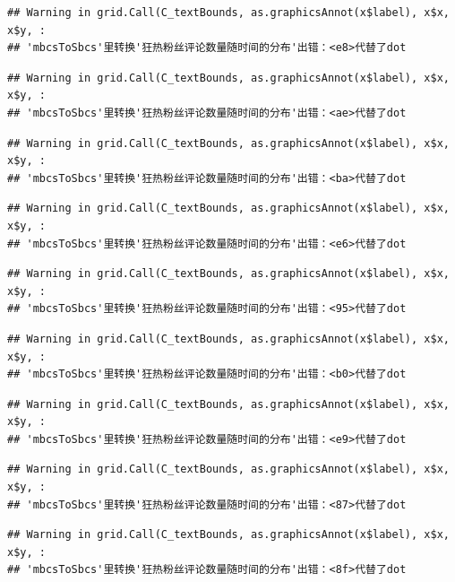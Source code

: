 \documentclass[
]{article}
\begin{document}
\begin{verbatim}
## Warning in grid.Call(C_textBounds, as.graphicsAnnot(x$label), x$x, x$y, :
## 'mbcsToSbcs'里转换'狂热粉丝评论数量随时间的分布'出错：<e8>代替了dot
\end{verbatim}

\begin{verbatim}
## Warning in grid.Call(C_textBounds, as.graphicsAnnot(x$label), x$x, x$y, :
## 'mbcsToSbcs'里转换'狂热粉丝评论数量随时间的分布'出错：<ae>代替了dot
\end{verbatim}

\begin{verbatim}
## Warning in grid.Call(C_textBounds, as.graphicsAnnot(x$label), x$x, x$y, :
## 'mbcsToSbcs'里转换'狂热粉丝评论数量随时间的分布'出错：<ba>代替了dot
\end{verbatim}

\begin{verbatim}
## Warning in grid.Call(C_textBounds, as.graphicsAnnot(x$label), x$x, x$y, :
## 'mbcsToSbcs'里转换'狂热粉丝评论数量随时间的分布'出错：<e6>代替了dot
\end{verbatim}

\begin{verbatim}
## Warning in grid.Call(C_textBounds, as.graphicsAnnot(x$label), x$x, x$y, :
## 'mbcsToSbcs'里转换'狂热粉丝评论数量随时间的分布'出错：<95>代替了dot
\end{verbatim}

\begin{verbatim}
## Warning in grid.Call(C_textBounds, as.graphicsAnnot(x$label), x$x, x$y, :
## 'mbcsToSbcs'里转换'狂热粉丝评论数量随时间的分布'出错：<b0>代替了dot
\end{verbatim}

\begin{verbatim}
## Warning in grid.Call(C_textBounds, as.graphicsAnnot(x$label), x$x, x$y, :
## 'mbcsToSbcs'里转换'狂热粉丝评论数量随时间的分布'出错：<e9>代替了dot
\end{verbatim}

\begin{verbatim}
## Warning in grid.Call(C_textBounds, as.graphicsAnnot(x$label), x$x, x$y, :
## 'mbcsToSbcs'里转换'狂热粉丝评论数量随时间的分布'出错：<87>代替了dot
\end{verbatim}

\begin{verbatim}
## Warning in grid.Call(C_textBounds, as.graphicsAnnot(x$label), x$x, x$y, :
## 'mbcsToSbcs'里转换'狂热粉丝评论数量随时间的分布'出错：<8f>代替了dot
\end{verbatim}
\end{document}
